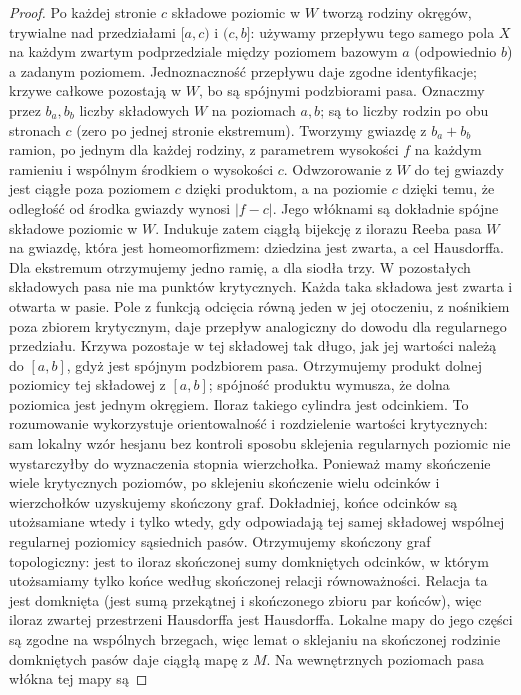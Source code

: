 \begin{proof}
Po każdej stronie $c$ składowe poziomic w $W$ tworzą
rodziny okręgów, trywialne nad przedziałami $[a,c)$
i $(c,b]$: używamy przepływu tego samego pola $X$
na każdym zwartym podprzedziale między poziomem
bazowym $a$ (odpowiednio $b$) a zadanym poziomem.
Jednoznaczność przepływu daje zgodne identyfikacje;
krzywe całkowe pozostają w $W$, bo są spójnymi
podzbiorami pasa. Oznaczmy przez $b_a,b_b$ liczby
składowych $W$ na poziomach $a,b$; są to liczby
rodzin po obu stronach $c$ (zero po jednej stronie
ekstremum).
Tworzymy gwiazdę z $b_a+b_b$ ramion, po jednym
dla każdej rodziny, z parametrem wysokości $f$
na każdym ramieniu i wspólnym środkiem o wysokości $c$.
Odwzorowanie z $W$ do tej gwiazdy jest ciągłe poza
poziomem $c$ dzięki produktom, a na poziomie $c$
dzięki temu, że odległość od środka gwiazdy wynosi
$|f-c|$. Jego włóknami są dokładnie spójne składowe
poziomic w $W$. Indukuje zatem ciągłą bijekcję
z ilorazu Reeba pasa $W$ na gwiazdę, która jest
homeomorfizmem: dziedzina jest zwarta, a cel
Hausdorffa. Dla ekstremum otrzymujemy jedno ramię,
a dla siodła trzy. W pozostałych składowych pasa nie ma punktów krytycznych.
Każda taka składowa jest zwarta i otwarta w pasie.
Pole z funkcją odcięcia równą jeden w jej otoczeniu,
z nośnikiem poza zbiorem krytycznym, daje przepływ
analogiczny do dowodu dla regularnego przedziału.
Krzywa pozostaje w tej składowej tak długo, jak jej
wartości należą do $[a,b]$, gdyż jest spójnym podzbiorem
pasa. Otrzymujemy produkt dolnej poziomicy tej
składowej z $[a,b]$; spójność produktu wymusza,
że dolna poziomica jest jednym okręgiem. Iloraz
takiego cylindra jest odcinkiem.
To rozumowanie wykorzystuje orientowalność i rozdzielenie
wartości krytycznych: sam lokalny wzór hesjanu
bez kontroli sposobu sklejenia regularnych poziomic
nie wystarczyłby do wyznaczenia stopnia wierzchołka.
Ponieważ mamy skończenie wiele krytycznych poziomów,
po sklejeniu skończenie wielu odcinków i wierzchołków
uzyskujemy skończony graf. Dokładniej, końce
odcinków są utożsamiane wtedy i tylko wtedy, gdy
odpowiadają tej samej składowej wspólnej regularnej
poziomicy sąsiednich pasów. Otrzymujemy skończony graf topologiczny:
jest to iloraz skończonej sumy domkniętych odcinków,
w którym utożsamiamy tylko końce według skończonej
relacji równoważności. Relacja ta jest domknięta
(jest sumą przekątnej i skończonego zbioru par końców),
więc iloraz zwartej przestrzeni Hausdorffa jest
Hausdorffa. Lokalne mapy
do jego części są zgodne na wspólnych brzegach,
więc lemat o sklejaniu na skończonej rodzinie
domkniętych pasów daje ciągłą mapę z $M$.
Na wewnętrznych poziomach pasa włókna tej mapy są

\end{proof}
